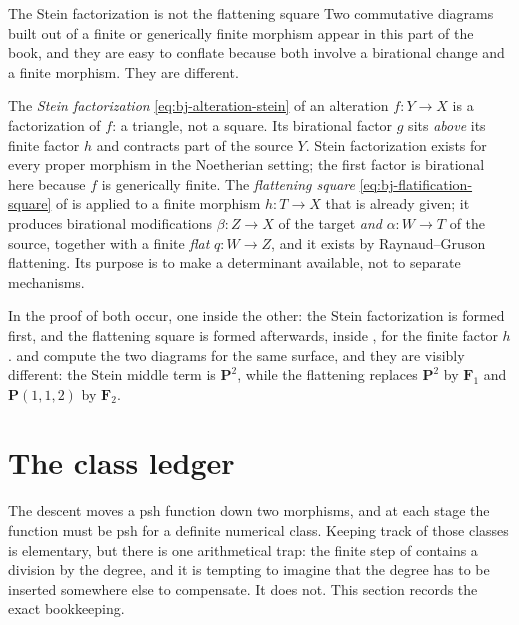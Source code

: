 \begin{warning}{The Stein factorization is not the flattening square}
\label{warn:ch42-stein-not-flattening}
Two commutative diagrams built out of a finite or generically finite
morphism appear in this part of the book, and they are easy to conflate
because both involve a birational change and a finite morphism.  They are
different.

The \emph{Stein factorization} \eqref{eq:bj-alteration-stein} of an
alteration $f:Y\to X$ is a factorization of $f$: a triangle, not a
square.  Its birational factor $g$ sits \emph{above} its finite factor
$h$ and contracts part of the source $Y$.
Stein factorization exists for every proper morphism in the Noetherian
setting; the first factor is birational here because $f$ is generically
finite.
The \emph{flattening square} \eqref{eq:bj-flatification-square} of
 is applied to a finite morphism
$h:T\to X$ that is already given; it produces birational modifications
$\beta:Z\to X$ of the target \emph{and} $\alpha:W\to T$ of the source,
together with a finite \emph{flat} $q:W\to Z$, and it exists by
Raynaud--Gruson flattening.  Its purpose is to make a determinant available,
not to separate mechanisms.

In the proof of  both occur, one inside the
other: the Stein factorization is formed first, and the flattening square is
formed afterwards, inside , for the
finite factor $h$.   and
 compute the two diagrams for the same surface,
and they are visibly different: the Stein middle term is $\mathbf P^2$,
while the flattening replaces $\mathbf P^2$ by $\mathbf F_1$ and
$\mathbf P(1,1,2)$ by $\mathbf F_2$.
\end{warning}

\section{The class ledger}
\label{sec:ch42-ledger}

The descent moves a psh function down two morphisms, and at each stage the
function must be psh for a definite numerical class.  Keeping track of those
classes is elementary, but there is one arithmetical trap: the finite step
of  contains a division by the degree, and it
is tempting to imagine that the degree has to be inserted somewhere else to
compensate.  It does not.  This section records the exact bookkeeping.


